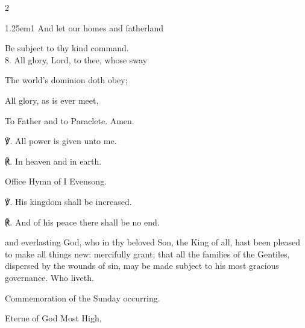 \begin{paracol}{2}
\begin{hangparas}{1.25em}{1}
And let our homes and fatherland

Be subject to thy kind command.\\

8. All glory, Lord, to thee, whose sway

The world's dominion doth obey;

All glory, as is ever meet,

To Father and to Paraclete. Amen.\\
\end{hangparas}

℣. All power is given unto me.

℟. In heaven and in earth.


\secondEvensong
{}

\begin{rubric}
	Office Hymn of I Evensong.
\end{rubric}

℣. His kingdom shall be increased.

℟. And of his peace there shall be no end.


\collect
{} and everlasting God, who in thy beloved Son, the King of all, hast been pleased to make all things new: mercifully grant; that all the families of the Gentiles, dispersed by the wounds of sin, may be made subject to his most gracious governance. Who liveth.
\begin{rubric}
    Commemoration of the Sunday occurring.
\end{rubric}

\switchcolumn

\mattins
{}

\mattinsInvitatoryHymn
{} Eterne of God Most High,



\end{paracol}
